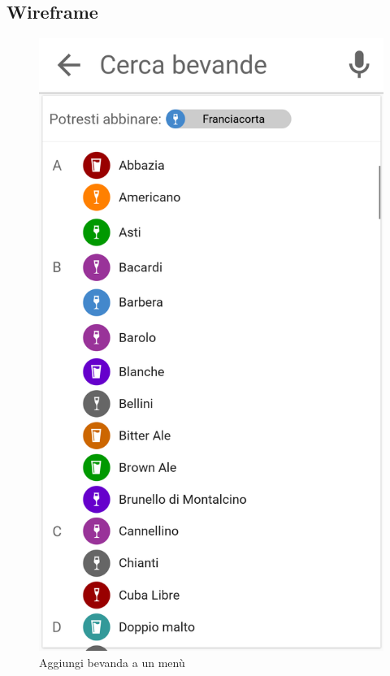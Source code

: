 \subsection{Wireframe}
\begin{figure}[H]
	\begin{minipage}{.49\textwidth}
		\includegraphics[width=\textwidth]{img/wireframe/aggiungi_bevanda_consiglio.png}
		\caption{Aggiungi bevanda a un menù}
	\end{minipage}
	\hfill
	\begin{minipage}{.49\textwidth}

\end{minipage}
\end{figure}
